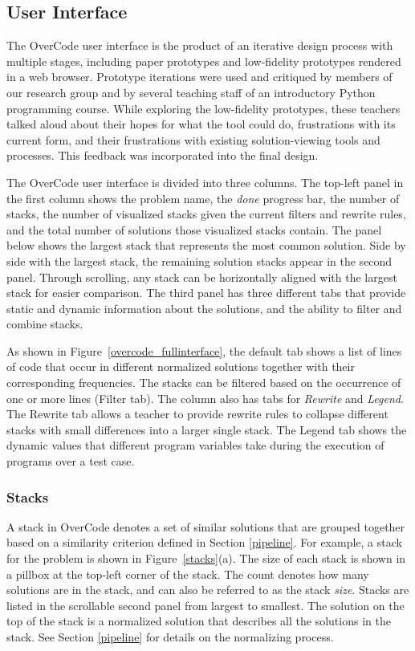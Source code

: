 \subsection{User Interface}

The OverCode user interface is the product of an iterative design process with multiple stages, including paper prototypes and low-fidelity prototypes rendered in a web browser.  Prototype iterations were used and critiqued by members of our research group and by several teaching staff of an introductory Python programming course. While exploring the low-fidelity prototypes, these teachers talked aloud about their hopes for what the tool could do, frustrations with its current form, and their frustrations with existing solution-viewing tools and processes. This feedback was incorporated into the final design.

The OverCode user interface is divided into three columns. The top-left panel in the first column shows the problem name, the \emph{done} progress bar, the number of stacks, the number of visualized stacks given the current filters and rewrite rules, and the total number of solutions those visualized stacks contain. The panel below shows the largest stack that represents the most common solution. Side by side with the largest stack, the remaining solution stacks appear in the second panel. Through scrolling, any stack can be horizontally aligned with the largest stack for easier comparison. The third panel has three different tabs that provide static and dynamic information about the solutions, and the ability to filter and combine stacks. 

As shown in Figure~\ref{overcode_fullinterface}, the default tab shows a list of lines of code that occur in different normalized solutions together with their corresponding frequencies. The stacks can be filtered based on the occurrence of one or more lines (Filter tab). The column also has tabs for \emph{Rewrite} and \emph{Legend}. The Rewrite tab allows a teacher to provide rewrite rules to collapse different stacks with small differences into a larger single stack. The Legend tab shows the dynamic values that different program variables take during the execution of programs over a test case. %


\subsubsection{Stacks} A stack in OverCode denotes a set of similar solutions that are grouped together based on a similarity criterion defined in Section \ref{pipeline}. For example, a stack for the  problem is shown in Figure~\ref{stacks}(a). The size of each stack is shown in a pillbox at the top-left corner of the stack. The count denotes how many solutions are in the stack, and can also be referred to as the stack {\it size}. Stacks are listed in the scrollable second panel from largest to smallest. The solution on the top of the stack is a normalized solution that describes all the solutions in the stack. See Section \ref{pipeline} for details on the normalizing process.

